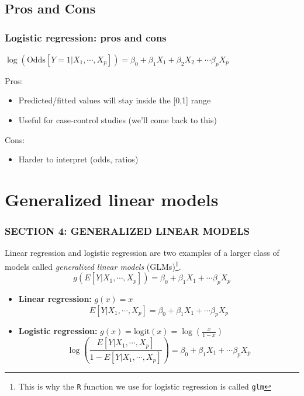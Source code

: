 \documentclass[12pt, 
hyperref={colorlinks=true, linkcolor=blue, urlcolor=cyan}]{beamer}
\begin{document}
\subsection{Pros and Cons}
\begin{frame}
\frametitle{Logistic regression: pros and cons}
\begin{center} $\log\left(\text{Odds}[Y=1|X_1,\cdots,X_p]\right) = \beta_0 + \beta_1 X_1 + \beta_2 X_2 + \cdots \beta_p X_p$ \end{center}

Pros: \vspace{-0.3cm}
\begin{itemize}
\item Predicted/fitted values will stay inside the [0,1] range
\item Useful for case-control studies (we'll come back to this)
\end{itemize}

Cons: \vspace{-0.3cm}
\begin{itemize}
\item Harder to interpret (odds, ratios) 
\end{itemize}

\end{frame}


\section{Generalized linear models}
\begin{frame}
\frametitle{SECTION 4: GENERALIZED LINEAR MODELS}

Linear regression and logistic regression are two examples of a larger class of models called \textit{generalized linear models} (GLMs)\footnote[frame]{This is why the \texttt{R} function we use for logistic regression is called \texttt{glm}}.
$$g\left(E[Y|X_1,\cdots,X_p]\right) = \beta_0 + \beta_1 X_1 + \cdots \beta_pX_p$$ \pause

\vspace{-0.2cm}
\begin{itemize}
\item \textbf{Linear regression:} $g(x) = x$ $$E[Y|X_1,\cdots,X_p] = \beta_0 + \beta_1 X_1 + \cdots \beta_pX_p$$ \pause
\item \textbf{Logistic regression:} $g(x) = \text{logit}(x) = \log(\frac{x}{1-x})$ $$\log\left(\frac{E[Y|X_1,\cdots,X_p]}{1-E[Y|X_1,\cdots,X_p]}\right) = \beta_0 + \beta_1 X_1 + \cdots \beta_pX_p$$
\end{itemize}


\end{frame}
\end{document}

